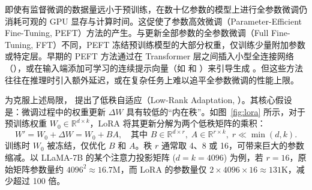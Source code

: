 即使有监督微调的数据量远小于预训练，在数十亿参数的模型上进行全参数微调仍消耗可观的 GPU 显存与计算时间。这促使了参数高效微调（Parameter-Efficient Fine-Tuning, PEFT）方法的产生。与更新全部参数的全参数微调（Full Fine-Tuning, FFT）不同，PEFT 冻结预训练模型的大部分权重，仅训练少量附加参数或特定层。早期的 PEFT 方法通过在 Transformer 层之间插入小型全连接网络（）\cite{houlsby-etal:2019adapter}，或在输入端添加可学习的连续提示向量（如  和 ）来引导生成 \cite{li-liang:2021prefix,lester-etal:2021prompt}。但这些方法往往在推理时引入额外延迟，或在复杂任务上难以追平全参数微调的性能上限。

为克服上述局限，\citet{hu-etal:2021lora} 提出了低秩自适应（Low-Rank Adaptation, ）。其核心假设是：微调过程中的权重更新 $\Delta W$ 具有较低的“内在秩”。如图~\ref{fig:lora} 所示，对于预训练权重 $W_0 \in \mathbb{R}^{d \times k}$，LoRA 将其更新分解为两个低秩矩阵的乘积：
\begin{equation}
W' = W_0 + \Delta W = W_0 + B A,\quad \text{其中 } B \in \mathbb{R}^{d \times r},\; A \in \mathbb{R}^{r \times k},\; r \ll \min(d,k).
\end{equation}
训练时 $W_0$ 被冻结，仅优化 $B$ 和 $A$。秩 $r$ 通常取 4、8 或 16，可带来巨大的参数缩减。以 LLaMA-7B 的某个注意力投影矩阵 ($d=k=4096$) 为例，若 $r=16$，原始矩阵参数量约 $4096^2 \approx 16.7\text{M}$，而 LoRA 的参数量仅 $2 \times 4096 \times 16 \approx 131\text{K}$，减少超过 100 倍。

